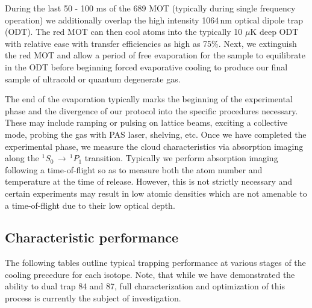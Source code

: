 During the last 50 - 100 ms of the 689 MOT (typically during single frequency operation) we additionally overlap the high intensity 1064\,nm optical dipole trap (ODT).
The red MOT can then cool atoms into the typically 10 $\mu$K deep ODT with relative ease with transfer efficiencies as high as 75\%. 
Next, we extinguish the red MOT and allow a period of free evaporation for the sample to equilibrate in the ODT before beginning forced evaporative cooling to produce our final sample of ultracold or quantum degenerate gas.

The end of the evaporation typically marks the beginning of the experimental phase and the divergence of our protocol into the specific procedures necessary. 
These may include ramping or pulsing on lattice beams, exciting a collective mode, probing the gas with PAS laser, shelving, etc. 
Once we have completed the experimental phase, we measure the cloud characteristics via absorption imaging along the $^1S_0\,\rightarrow\,^1P_1$ transition. 
Typically we perform absorption imaging following a time-of-flight so as to measure both the atom number and temperature at the time of release. 
However, this is not strictly necessary and certain experiments may result in low atomic densities which are not amenable to a time-of-flight due to their low optical depth.

\subsection{Characteristic performance} \label{sec:benchmark_trapping}
The following tables outline typical trapping performance at various stages of the cooling precedure for each isotope. Note, that while we have demonstrated the ability to dual trap 84 and 87, full characterization and optimization of this process is currently the subject of investigation.





